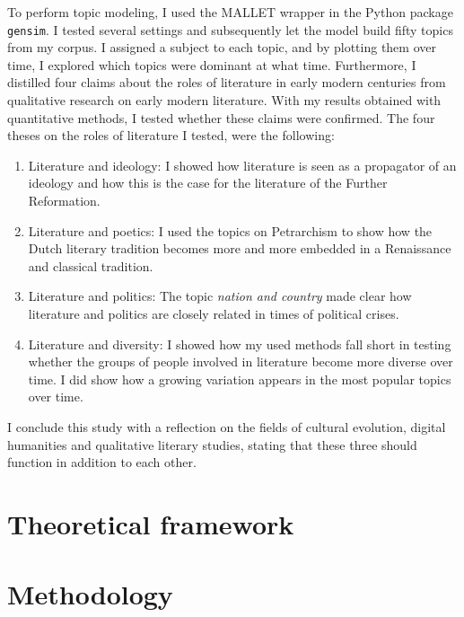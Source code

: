 \documentclass[a4paper,12pt,openright,twoside,unknownkeysallowed]{book}
\begin{document}
To perform topic modeling, I used the MALLET wrapper in the Python package \texttt{gensim}. I tested several settings and subsequently let the model build fifty topics from my corpus. I assigned a subject to each topic, and by plotting them over time, I explored which topics were dominant at what time. Furthermore, I distilled four claims about the roles of literature in early modern centuries from qualitative research on early modern literature. With my results obtained with quantitative methods, I tested whether these claims were confirmed. The four theses on the roles of literature I tested, were the following:

\begin{enumerate}
	\item Literature and ideology: I showed how literature is seen as a propagator of an ideology and how this is the case for the literature of the Further Reformation.
	\item Literature and poetics: I used the topics on Petrarchism to show how the Dutch literary tradition becomes more and more embedded in a Renaissance and classical tradition.
	\item Literature and politics: The topic \textit{nation and country} made clear how literature and politics are closely related in times of political crises.
	\item Literature and diversity: I showed how my used methods fall short in testing whether the groups of people involved in literature become more diverse over time. I did show how a growing variation appears in the most popular topics over time.
\end{enumerate}

\noindent I conclude this study with a reflection on the fields of cultural evolution, digital humanities and qualitative literary studies, stating that these three should function in addition to each other.

\tableofcontents

\mainmatter

\part{Theoretical framework}
	
	
\part{Methodology}
	
	
	
\end{document}
